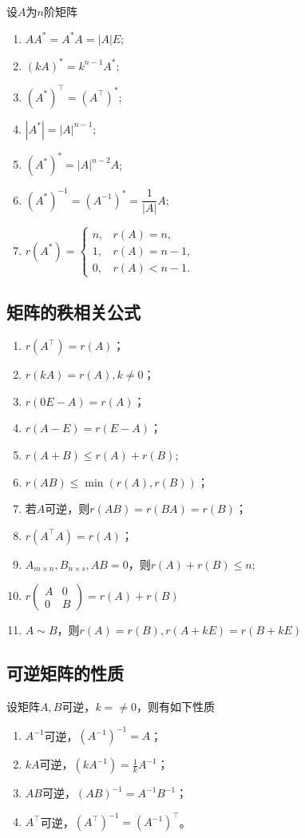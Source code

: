 设$A$为$n$阶矩阵
\begin{enumerate}[(1)]
    \item $AA^*=A^*A=|A|E$;
    \item $(kA)^* = k^{n-1}A^*$;
    \item $(A^*)^\intercal = (A^\intercal)^*$;
    \item $|A^*|=|A|^{n-1}$;
    \item $(A^*)^*=|A|^{n-2}A$;
    \item $(A^*)^{-1} = (A^{-1})^* = \dfrac{1}{|A|}A$;
    \item $
              r(A^*) =
              \begin{cases}
                  n, & r(A)=n,   \\
                  1, & r(A)=n-1, \\
                  0, & r(A)<n-1.
              \end{cases}
          $
\end{enumerate}

\subsection{矩阵的秩相关公式}
\label{sec:矩阵的秩相关公式}

\begin{enumerate}[(1)]
    \item $r(A^\intercal) = r(A)$；
    \item $r(kA) = r(A), k\neq 0$；
    \item $r(0E - A) = r(A)$；
    \item $r(A-E) = r(E-A)$；
    \item $r(A+B)\leq r(A) + r(B)$;
    \item $r(AB)\leq \min(r(A),r(B))$；
    \item 若$A$可逆，则$r(AB)=r(BA)=r(B)$；
    \item $r(A^\intercal A) = r(A )$；
    \item $A_{m\times n}, B_{n\times s}, AB=0$，则$r(A)+r(B)\leq n$;
    \item $
              r\begin{pmatrix}
                  A & 0 \\
                  0 & B
              \end{pmatrix}
              =r(A)+r(B)
          $
    \item $A\sim B$，则$r(A)=r(B), r(A+kE)=r(B+kE)$
\end{enumerate}

\subsection{可逆矩阵的性质}\label{sec:可逆矩阵的性质}
设矩阵$A,B$可逆，$k=\neq 0$，则有如下性质
\begin{enumerate}[(1)]
    \item $A^{-1}$可逆，$(A^{-1})^{-1} = A$；
    \item $kA$可逆，$(kA^{-1}) = \frac{1}{k} A^{-1}$；
    \item $AB$可逆，$(AB)^{-1} = A^{-1}B^{-1}$；
    \item $A^\intercal$可逆，$(A^\intercal)^{-1} = (A^{-1})^\intercal$。
\end{enumerate}